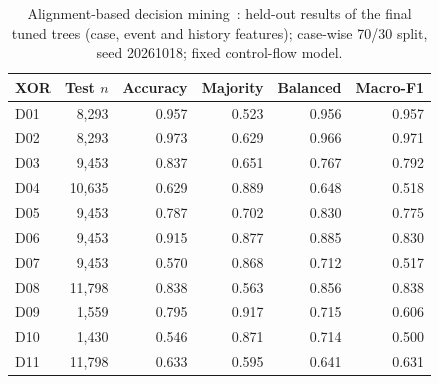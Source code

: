 \begin{table}[t]
\centering
\caption{Alignment-based decision mining~\cite{deleoni2013dataaware}: held-out results of the final tuned trees (case, event and history features); case-wise 70/30 split, seed 20261018; fixed control-flow model.}
\label{tab:decision-mining}
\begin{tabular}{lrrrrr}
\hline
XOR & Test $n$ & Accuracy & Majority & Balanced & Macro-F1 \\
\hline
D01 & 8,293 & 0.957 & 0.523 & 0.956 & 0.957 \\
D02 & 8,293 & 0.973 & 0.629 & 0.966 & 0.971 \\
D03 & 9,453 & 0.837 & 0.651 & 0.767 & 0.792 \\
D04 & 10,635 & 0.629 & 0.889 & 0.648 & 0.518 \\
D05 & 9,453 & 0.787 & 0.702 & 0.830 & 0.775 \\
D06 & 9,453 & 0.915 & 0.877 & 0.885 & 0.830 \\
D07 & 9,453 & 0.570 & 0.868 & 0.712 & 0.517 \\
D08 & 11,798 & 0.838 & 0.563 & 0.856 & 0.838 \\
D09 & 1,559 & 0.795 & 0.917 & 0.715 & 0.606 \\
D10 & 1,430 & 0.546 & 0.871 & 0.714 & 0.500 \\
D11 & 11,798 & 0.633 & 0.595 & 0.641 & 0.631 \\
\hline
\end{tabular}
\end{table}
